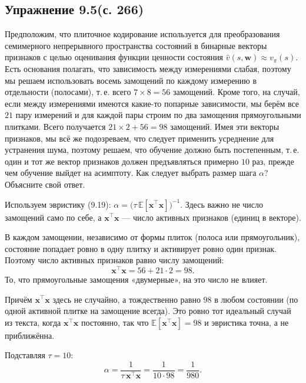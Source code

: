 \subsection{Упражнение 9.5(с. 266)}
Предположим, что плиточное кодирование используется для преобразования
семимерного непрерывного пространства состояний в бинарные векторы признаков с
целью оценивания функции ценности состояния $\hat v(s,\mathbf w)\approx
v_\pi(s)$. Есть основания полагать, что зависимость между измерениями слабая,
поэтому мы решаем использовать восемь замощений по каждому измерению в
отдельности (полосами), т.\,е. всего $7\times 8 = 56$ замощений. Кроме того, на
случай, если между измерениями имеются какие-то попарные зависимости, мы берём
все $21$ пару измерений и для каждой пары строим по два замощения прямоугольными
плитками. Всего получается $21\times 2 + 56 = 98$ замощений. Имея эти векторы
признаков, мы всё же подозреваем, что следует применить усреднение для устранения
шума, поэтому решаем, что обучение должно быть постепенным, т.\,е. один и тот же
вектор признаков должен предъявляться примерно $10$ раз, прежде чем обучение
выйдет на асимптоту. Как следует выбрать размер шага $\alpha$? Объясните свой
ответ.

\begin{solution}
    Используем эвристику (9.19): $\alpha = \big(\tau\,\mathbb E[\mathbf x^\top
    \mathbf x]\big)^{-1}$. Здесь важно не число замощений само по себе, а
    $\mathbf x^\top\mathbf x$ --- число активных признаков (единиц в векторе).

    В каждом замощении, независимо от формы плиток (полоса или прямоугольник),
    состояние попадает ровно в одну плитку и активирует ровно один признак.
    Поэтому число активных признаков равно числу замощений:
    \begin{equation*}
        \mathbf x^\top\mathbf x = 56 + 21\cdot 2 = 98.
    \end{equation*}
    То, что прямоугольные замощения «двумерные», на это число не влияет.

    Причём $\mathbf x^\top\mathbf x$ здесь не случайно, а тождественно равно $98$ в
    любом состоянии (по одной активной плитке на замощение всегда). Это ровно тот
    идеальный случай из текста, когда $\mathbf x^\top\mathbf x$ постоянно, так что
    $\mathbb E[\mathbf x^\top\mathbf x] = 98$ и эвристика точна, а не приближённа.

    Подставляя $\tau = 10$:
    \begin{equation*}
        \alpha = \frac{1}{\tau\,\mathbf x^\top\mathbf x} = \frac{1}{10\cdot 98}
        = \frac{1}{980}.
    \end{equation*}
\end{solution}
